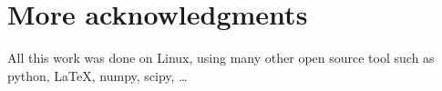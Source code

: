 \chapter{More acknowledgments}
All this work was done on Linux, using many other open source tool such as
python, \LaTeX, numpy, scipy, …
